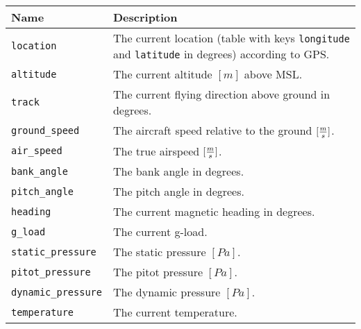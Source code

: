 \begin{maxipage}
\begin{tabularx}{1.9\textwidth}{l|X}
Name & Description \\
\hline\hline

\verb|location| & The current location (table with
keys \verb|longitude| and \verb|latitude| in degrees) according to
GPS. \\

\hline

\verb|altitude| & The current altitude $[m]$ above MSL. \\

\hline

\verb|track| & The current flying direction above ground in degrees. \\

\hline

\verb|ground_speed| & The aircraft speed relative to the ground
$[{m \over s}]$. \\

\hline

\verb|air_speed| & The true airspeed
$[{m \over s}]$. \\

\hline

\verb|bank_angle| & The bank angle in degrees. \\

\hline

\verb|pitch_angle| & The pitch angle in degrees. \\

\hline

\verb|heading| & The current magnetic heading in degrees. \\

\hline

\verb|g_load| & The current g-load. \\

\hline

\verb|static_pressure| & The static pressure
$[{Pa}]$. \\

\hline

\verb|pitot_pressure| & The pitot pressure
$[{Pa}]$. \\

\hline

\verb|dynamic_pressure| & The dynamic pressure
$[{Pa}]$. \\

\hline

\verb|temperature| & The current temperature. \\


\end{tabularx}
\end{maxipage}

